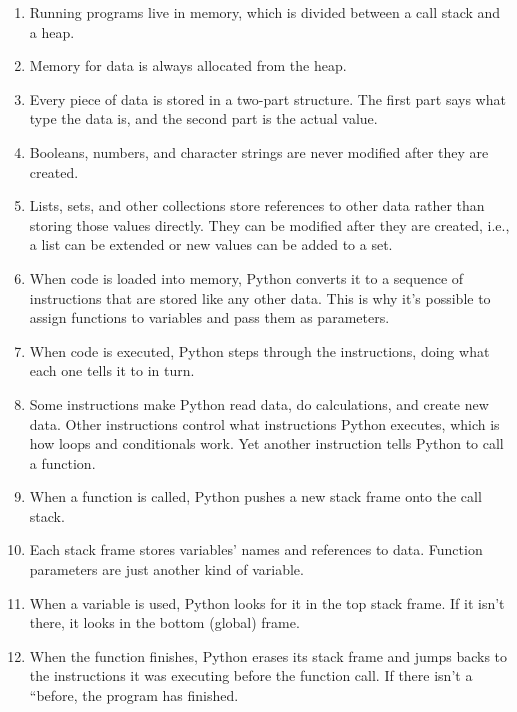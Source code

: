 \begin{enumerate}

\item
  Running programs live in memory,
  which is divided between a call stack and a heap.

\item
  Memory for data is always allocated from the heap.

\item
  Every piece of data is stored in a two-part structure.
  The first part says what type the data is,
  and the second part is the actual value.

\item
  Booleans, numbers, and character strings are never modified after they are created.

\item
  Lists, sets, and other collections store references to other data
  rather than storing those values directly.
  They can be modified after they are created,
  i.e.,
  a list can be extended or new values can be added to a set.

\item
  When code is loaded into memory,
  Python converts it to a sequence of instructions
  that are stored like any other data.
  This is why it's possible to assign functions to variables
  and pass them as parameters.

\item
  When code is executed,
  Python steps through the instructions,
  doing what each one tells it to in turn.

\item
  Some instructions make Python read data,
  do calculations,
  and create new data.
  Other instructions control what instructions Python executes,
  which is how loops and conditionals work.
  Yet another instruction tells Python to call a function.

\item
  When a function is called,
  Python pushes a new stack frame onto the call stack.

\item
  Each stack frame stores variables' names and references to data.
  Function parameters are just another kind of variable.

\item
  When a variable is used,
  Python looks for it in the top stack frame.
  If it isn't there, it looks in the bottom (global) frame.

\item
  When the function finishes,
  Python erases its stack frame and jumps backs to
  the instructions it was executing before the function call.
  If there isn't a ``before,
  the program has finished.

\end{enumerate}

